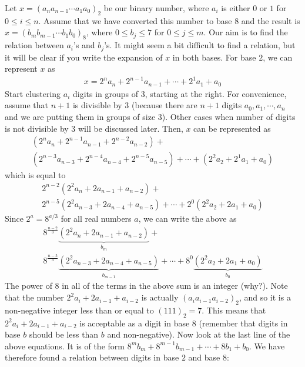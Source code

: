 \documentclass{subfile}
\begin{document}
	Let $x = (a_{n}a_{n-1}\cdots a_1a_0)_2$ be our binary number, where $a_i$ is either $0$ or $1$ for $0\leq i \leq n$. Assume that we have converted this number to base $8$ and the result is $x = (b_{m}b_{m-1}\cdots b_1b_0)_8$, where $0\leq b_j \leq 7$ for $0 \leq j \leq m$. Our aim is to find the relation between $a_i$'s and $b_j$'s. It might seem a bit difficult to find a relation, but it will be clear if you write the expansion of $x$ in both bases. For base $2$, we can represent $x$ as
	\begin{align*}
		x =  2^{n} a_{n} + 2^{n-1} a_{n-1} + \cdots + 2^1a_1 + a_0
	\end{align*}
	Start clustering $a_i$ digits in groups of $3$, starting at the right. For convenience, assume that $n+1$ is divisible by $3$ (because there are $n+1$ digits $a_0, a_1, \cdots, a_n$ and we are putting them in groups of size $3$). Other cases when number of digits is not divisible by $3$ will be discussed later. Then, $x$ can be represented as
	\begin{align*}
		 \left(2^{n} a_{n} + 2^{n-1} a_{n-1} + 2^{n-2} a_{n-2} \right) + \\ \left(2^{n-3}  a_{n-3} + 2^{n-4} a_{n-4} + 2^{n-5} a_{n-5} \right) +\cdots + \left( 2^2a_2 + 2^1a_1 + a_0 \right)
	\end{align*}
	which is equal to
	\begin{align*}
		2^{n-2}\left(2^2 a_{n} + 2 a_{n-1} + a_{n-2} \right) + \\ 2^{n-5} \left(2^2 a_{n-3}  +  2 a_{n-4} + a_{n-5} \right)+  \cdots + 2^0\left( 2^2a_2 + 2a_1 + a_0 \right)
	\end{align*}
	Since $2^{a}=8^{a/3}$ for all real numbers $a$, we can write the above as
	\begin{multline*}
   		8^{\frac{n-2}{3}} \underbrace{\left(2^2 a_{n} + 2 a_{n-1} + a_{n-2} \right)}_{b_m} + \\ 8^{\frac{n-5}{3}}  \underbrace{\left(2^2 a_{n-3} + 2 a_{n-4} + a_{n-5} \right)}_{b_{m-1}} + \cdots + 8^0 \underbrace{\left( 2^2a_2 + 2a_1 + a_0 \right)}_{b_0}
	\end{multline*}
	The power of $8$ in all of the terms in the above sum is an integer (why?). Note that the number $2^2 a_i + 2 a_{i-1} + a_{i-2}$ is actually $(a_{i}a_{i-1}a_{i-2})_2$, and so it is a non-negative integer less than or equal to $(111)_2 = 7$. This means that $2^2 a_i + 2 a_{i-1} + a_{i-2}$ is acceptable as a digit in base $8$ (remember that digits in base $b$ should be less than $b$ and non-negative). Now look at the last line of the above equations. It is of the form $8^m b_m + 8^{m-1}b_{m-1} + \cdots + 8b_1+b_0$. We have therefore found a relation between digits in base $2$ and base $8$:
\end{document}
